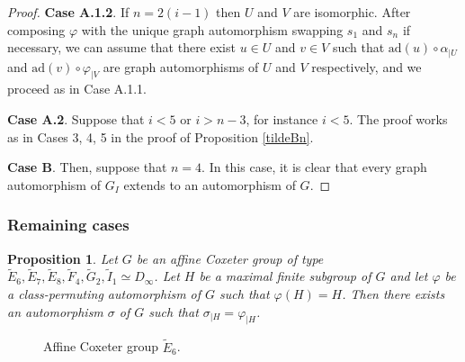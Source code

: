 \documentclass[a4paper, 11pt]{amsart}
\newtheorem{prop}[te]{Proposition}
\theoremstyle{definition}
\theoremstyle{remark}
\begin{document}
\begin{proof}
\smallskip

\noindent \textbf{Case A.1.2}. If $n=2(i-1)$ then $U$ and $V$ are isomorphic. After composing $\varphi$ with the unique graph automorphism swapping $s_1$ and $s_n$ if necessary, we can assume that there exist $u\in U$ and $v\in V$ such that $\mathrm{ad}(u)\circ \alpha_{\vert U}$ and $\mathrm{ad}(v)\circ \varphi_{\vert V}$ are graph automorphisms of $U$ and $V$ respectively, and we proceed as in Case A.1.1.

\smallskip

\noindent \textbf{Case A.2}. Suppose that $i<5$ or $i > n-3$, for instance $i<5$. The proof works as in Cases 3, 4, 5 in the proof of Proposition \ref{tildeBn}.

\smallskip

\noindent \textbf{Case B}. Then, suppose that $n=4$. In this case, it is clear that every graph automorphism of $G_I$ extends to an automorphism of $G$.\end{proof}

\subsubsection{Remaining cases}

\begin{prop}\label{tildesporadic}
Let $G$ be an affine Coxeter group of type $\tilde{E}_6,\tilde{E}_7,\tilde{E}_8, \tilde{F}_4,\tilde{G}_2,\tilde{I}_1\simeq D_{\infty}$. Let $H$ be a maximal finite subgroup of $G$ and let $\varphi$ be a class-permuting automorphism of $G$ such that $\varphi(H)=H$. Then there exists an automorphism $\sigma$ of $G$ such that $\sigma_{\vert H}=\varphi_{\vert H}$.
\end{prop}

\begin{figure}[h!]
  \centering
  \caption{Affine Coxeter group $\tilde{E}_6$.}
  \label{E6}
\end{figure}
\end{document}
